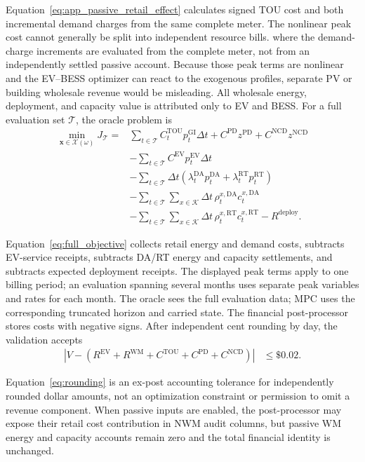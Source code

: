 \documentclass[final,5p,times]{elsarticle}
\newcommand{\dt}{\Delta t}
\newcommand{\EV}{\mathrm{EV}}
\newcommand{\DA}{\mathrm{DA}}
\newcommand{\RT}{\mathrm{RT}}
\newcommand{\GI}{\mathrm{GI}}
\newcommand{\TOU}{\mathrm{TOU}}
\newcommand{\PD}{\mathrm{PD}}
\newcommand{\NCD}{\mathrm{NCD}}
\newcommand{\WM}{\mathrm{WM}}
\newcommand{\calT}{\mathcal{T}}
\newcommand{\calK}{\mathcal{K}}
\begin{document}
Equation~\eqref{eq:app_passive_retail_effect} calculates signed TOU cost and both incremental demand charges from the same complete meter. The nonlinear peak cost cannot generally be split into independent resource bills.
where the demand-charge increments are evaluated from the complete meter, not
from an independently settled passive account. Because those peak terms are
nonlinear and the EV--BESS optimizer can react to the exogenous profiles,
separate PV or building wholesale revenue would be misleading. All wholesale
energy, deployment, and capacity value is attributed only to EV and BESS.
For a full evaluation set $\calT$, the oracle problem is
\begin{align}
\min_{\boldsymbol{x}\in\mathcal{X}(\omega)}J_{\calT}
={}&\sum_{t\in\calT} C_t^{\TOU}p_t^{\GI}\dt
+C^{\PD}z^{\PD}+C^{\NCD}z^{\NCD}\nonumber\\
&-\sum_{t\in\calT}C^{\EV}p_t^{\EV}\dt\nonumber\\
&-\sum_{t\in\calT}\dt
\left(\lambda_t^{\DA}p_t^{\DA}
+\lambda_t^{\RT}p_t^{\RT}\right)\nonumber\\
&-\sum_{t\in\calT}\sum_{x\in\calK}\dt\,
\rho_t^{x,\DA}c_t^{x,\DA}\nonumber\\
&-\sum_{t\in\calT}\sum_{x\in\calK}\dt\,
\rho_t^{x,\RT}c_t^{x,\RT}
-R^{\mathrm{deploy}}. \label{eq:full_objective}
\end{align}

Equation~\eqref{eq:full_objective} collects retail energy and demand costs, subtracts EV-service receipts, subtracts DA/RT energy and capacity settlements, and subtracts expected deployment receipts. The displayed peak terms apply to one billing period; an evaluation spanning several months uses separate peak variables and rates for each month. The oracle sees the full evaluation data; MPC uses the corresponding truncated horizon and carried state.
The financial post-processor stores costs with negative signs. After independent
cent rounding by day, the validation accepts
\begin{align}
\left|V-\left(R^{\EV}+R^{\WM}+C^{\TOU}
+C^{\PD}+C^{\NCD}\right)\right|
&\le \$0.02. \label{eq:rounding}
\end{align}

Equation~\eqref{eq:rounding} is an ex-post accounting tolerance for independently rounded dollar amounts, not an optimization constraint or permission to omit a revenue component.
When passive inputs are enabled, the post-processor may expose their retail
cost contribution in NWM audit columns, but passive WM energy and capacity
accounts remain zero and the total financial identity is unchanged.
\end{document}

